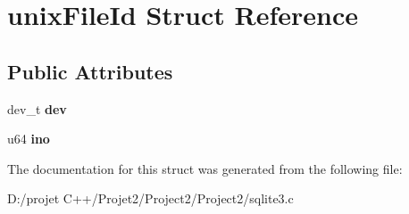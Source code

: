 \hypertarget{structunix_file_id}{}\section{unix\+File\+Id Struct Reference}
\label{structunix_file_id}
\subsection*{Public Attributes}
\begin{DoxyCompactItemize}
\item 
\mbox{\label{structunix_file_id_acf703d95b9a1ae2f34affb7e9ae45e1b}} 
dev\+\_\+t {\bfseries dev}
\item 
\mbox{\label{structunix_file_id_af64b38d971f7495524ed628116c5301d}} 
u64 {\bfseries ino}
\end{DoxyCompactItemize}


The documentation for this struct was generated from the following file\+:\begin{DoxyCompactItemize}
\item 
D\+:/projet C++/\+Projet2/\+Project2/\+Project2/sqlite3.\+c\end{DoxyCompactItemize}
